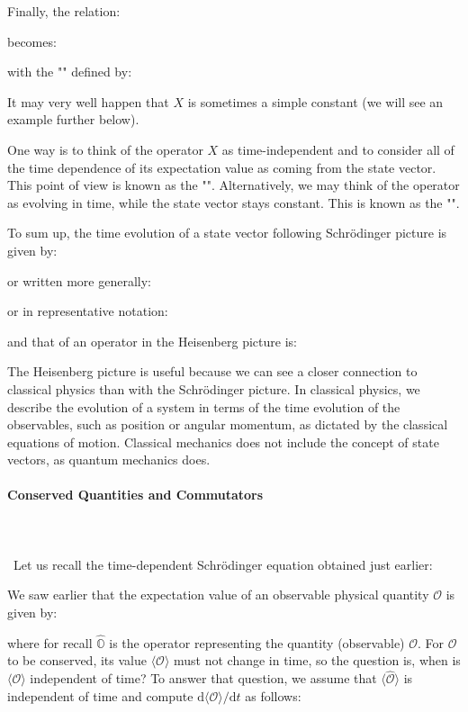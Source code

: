	Finally, the relation:
	
	becomes:
	
	with the "" defined by:
	
	\begin{tcolorbox}[title=Remark,colframe=black,arc=10pt]
	It may very well happen that $X$ is sometimes a simple constant (we will see an example further below).
	\end{tcolorbox}
	 One way is to think of the operator $X$ as time-independent and to consider all of the time dependence of its expectation value as coming from the state vector. This point of view is known as the "". Alternatively, we may think of the operator as evolving in time, while the state vector stays constant. This is known as the "". 
	 
	 To sum up, the time evolution of a state vector following Schrödinger picture is given by:
	
	or written more generally:
	
	or in representative notation:
	
	and that of an operator in the Heisenberg picture is:
	
	The Heisenberg picture is useful because we can see a closer connection to classical physics than with the Schrödinger picture. In classical physics, we describe the evolution of a system in terms of the time evolution of the observables, such as position or angular momentum, as dictated by the classical equations of motion. Classical mechanics does not include the concept of state vectors, as quantum mechanics does.
	
	\paragraph{Conserved Quantities and Commutators}\mbox{}\\\\\
	Let us recall the time-dependent Schrödinger equation obtained just earlier:
	
	We saw earlier that the expectation value of an observable physical quantity $\mathcal{O}$ is given by:
	
	where for recall $\hat{\mathbb{O}}$ is the operator representing the quantity (observable) $\mathcal{O}$. For $\mathcal{O}$ to be conserved, its value $\langle \mathcal{O} \rangle$ must not change in time, so the question is, when is  $\langle \mathcal{O} \rangle$ independent of time? To answer that question, we assume that  $\langle \hat{\mathcal{O}} \rangle$ is independent of time and compute $\mathrm{d}\langle \mathcal{O} \rangle/\mathrm{d}t$ as follows:
	
